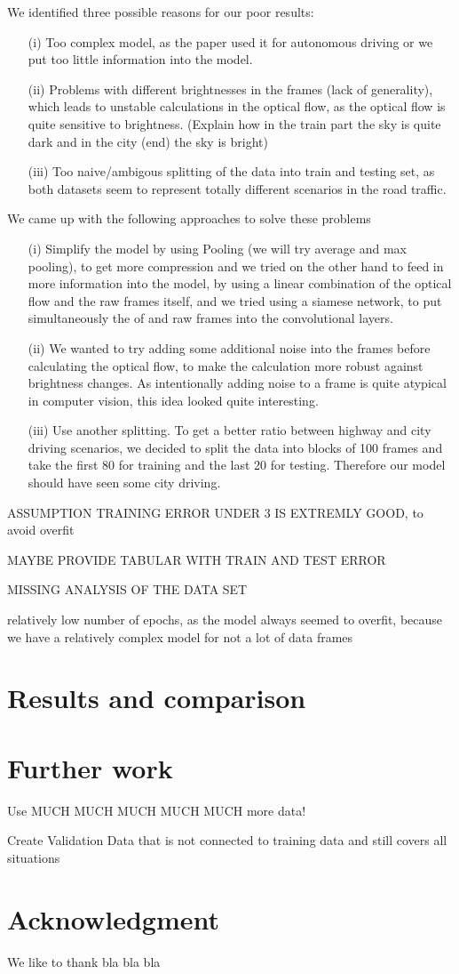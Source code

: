 \documentclass[conference]{IEEEtran}
\begin{document}
We identified three possible reasons for our poor results:
\begin{enumerate}
\item[(i)] Too complex model, as the paper used it for autonomous driving or we put too little information into the model.
\item[(ii)] Problems with different brightnesses in the frames (lack of generality), which leads to unstable calculations in the 
optical flow, as the optical flow is quite sensitive to brightness. (Explain how in the train part the sky is quite dark and in the 
city (end) the sky is bright)
\item[(iii)] Too naive/ambigous splitting of the data into train and testing set, as both datasets seem to represent totally different
scenarios in the road traffic.
\end{enumerate}
We came up with the following approaches to solve these problems
\begin{enumerate}
\item[(i)] Simplify the model by using Pooling (we will try average and max pooling), to get more compression and we tried on the
other hand to feed in more information into the model, by using a linear combination of the optical flow and the raw frames itself, and
we tried using a siamese network, to put simultaneously the of and raw frames into the convolutional layers.
\item[(ii)] We wanted to try adding some additional noise into the frames before calculating the optical flow, to make the calculation
more robust against brightness changes. As intentionally adding 
noise to a frame is quite atypical in computer vision, this idea looked quite interesting.
\item[(iii)] Use another splitting. To get a better ratio between highway and city driving scenarios, we decided to split the data into
blocks of 100 frames and take the first 80 for training and the last 20 for testing. Therefore our model should have seen some city
driving.
\end{enumerate}
ASSUMPTION TRAINING ERROR UNDER 3 IS EXTREMLY GOOD, to avoid overfit

MAYBE PROVIDE TABULAR WITH TRAIN AND TEST ERROR

MISSING ANALYSIS OF THE DATA SET

relatively low number of epochs, as the model always seemed to overfit, because we have a relatively complex model for not a lot of
data frames



\section{Results and comparison}

\section{Further work}

Use MUCH MUCH MUCH MUCH MUCH more data!

Create Validation Data that is not connected to training data and still covers all situations


\section*{Acknowledgment}
We like to thank bla bla bla




\printbibliography
\end{document}
